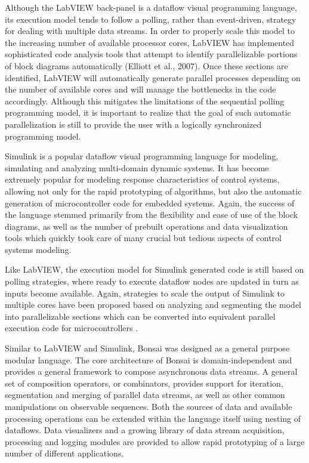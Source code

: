 Although the LabVIEW back-panel is a dataflow visual programming language, its execution model tends to follow a polling, rather than event-driven, strategy for dealing with multiple data streams. In order to properly scale this model to the increasing number of available processor cores, LabVIEW has implemented sophisticated code analysis tools that attempt to identify parallelizable portions of block diagrams automatically (Elliott et al., 2007). Once these sections are identified, LabVIEW will automatically generate parallel processes depending on the number of available cores and will manage the bottlenecks in the code accordingly. Although this mitigates the limitations of the sequential polling programming model, it is important to realize that the goal of such automatic parallelization is still to provide the user with a logically synchronized programming model.

Simulink is a popular dataflow visual programming language for modeling, simulating and analyzing multi-domain dynamic systems. It has become extremely popular for modeling response characteristics of control systems, allowing not only for the rapid prototyping of algorithms, but also the automatic generation of microcontroller code for embedded systems. Again, the success of the language stemmed primarily from the flexibility and ease of use of the block diagrams, as well as the number of prebuilt operations and data visualization tools which quickly took care of many crucial but tedious aspects of control systems modeling.

Like LabVIEW, the execution model for Simulink generated code is still based on polling strategies, where ready to execute dataflow nodes are updated in turn as inputs become available. Again, strategies to scale the output of Simulink to multiple cores have been proposed based on analyzing and segmenting the model into parallelizable sections which can be converted into equivalent parallel execution code for microcontrollers \cite{Kumura2012}.

Similar to LabVIEW and Simulink, Bonsai was designed as a general purpose modular language. The core architecture of Bonsai is domain-independent and provides a general framework to compose asynchronous data streams. A general set of composition operators, or combinators, provides support for iteration, segmentation and merging of parallel data streams, as well as other common manipulations on observable sequences. Both the sources of data and available processing operations can be extended within the language itself using nesting of dataflows. Data visualizers and a growing library of data stream acquisition, processing and logging modules are provided to allow rapid prototyping of a large number of different applications.

